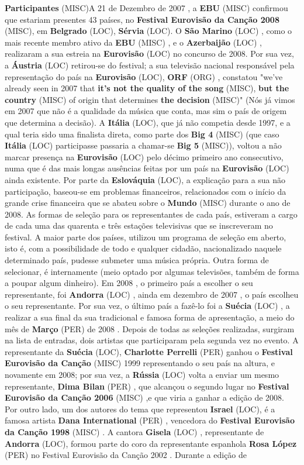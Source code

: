 \documentclass[12pt,a4paper]{article}
\begin{document}
\textbf{Participantes} (MISC)A 21 de Dezembro de 2007 , a \textbf{EBU} (MISC) confirmou que estariam presentes 43 países, no \textbf{Festival Eurovisão da Canção 2008} (MISC), em \textbf{Belgrado} (LOC), \textbf{Sérvia} (LOC). O \textbf{São Marino} (LOC) , como o mais recente membro ativo da \textbf{EBU} (MISC) , e o \textbf{Azerbaijão} (LOC) , realizaram a sua estreia na \textbf{Eurovisão} (LOC) no concurso de 2008. Por sua vez, a \textbf{Áustria} (LOC) retirou-se do festival; a sua televisão nacional responsável pela representação do país na \textbf{Eurovisão} (LOC), \textbf{ORF} (ORG) , constatou "we've already seen in 2007 that \textbf{it's not the quality of the song} (MISC), \textbf{but the country} (MISC) of origin that determines \textbf{the decision} (MISC)" (Nós já vimos em 2007 que não é a qualidade da música que conta, mas sim o país de origem que determina a decisão). A \textbf{Itália} (LOC), que já não competia desde 1997, e a qual teria sido uma finalista direta, como parte dos \textbf{Big 4} (MISC) (que caso \textbf{Itália} (LOC) participasse passaria a chamar-se \textbf{Big 5} (MISC)), voltou a não marcar presença na \textbf{Eurovisão} (LOC) pelo décimo primeiro ano consecutivo, numa que é das mais longas ausências feitas por um país na \textbf{Eurovisão} (LOC) ainda existente. Por parte da \textbf{Eslováquia} (LOC), a explicação para a sua não participação, baseou-se em problemas financeiros, relacionados com o início da grande crise financeira que se abateu sobre o \textbf{Mundo} (MISC) durante o ano de 2008. As formas de seleção para os representantes de cada país, estiveram a cargo de cada uma das quarenta e três estações televisivas que se inscreveram no festival. A maior parte dos países, utilizou um programa de seleção em aberto, isto é, com a possibilidade de todo e qualquer cidadão, nacionalizado naquele determinado país, pudesse submeter uma música própria. Outra forma de selecionar, é internamente (meio optado por algumas televisões, também de forma a poupar algum dinheiro). Em 2008 , o primeiro país a escolher o seu representante, foi \textbf{Andorra} (LOC) , ainda em dezembro de 2007 , o país escolheu o seu representante. Por sua vez, o último país a fazê-lo foi a \textbf{Suécia} (LOC) , a realizar a sua final da sua tradicional e famosa forma de apresentação, a meio do mês de \textbf{Março} (PER) de 2008 . Depois de todas as seleções realizadas, surgiram na lista de entradas, dois artistas que participaram pela segunda vez no evento. A representante da \textbf{Suécia} (LOC), \textbf{Charlotte Perrelli} (PER) ganhou o \textbf{Festival Eurovisão da Canção} (MISC) 1999 representando o seu país na altura, e novamente em 2008; por sua vez, a \textbf{Rússia} (LOC) volta a enviar um mesmo representante, \textbf{Dima Bilan} (PER) , que alcançou o segundo lugar no \textbf{Festival Eurovisão da Canção 2006} (MISC) ,e que viria a ganhar a edição de 2008. Por outro lado, um dos autores do tema que representou \textbf{Israel} (LOC), é a famosa artista \textbf{Dana International} (PER) , vencedora do \textbf{Festival Eurovisão da Canção 1998} (MISC) . A cantora \textbf{Gisela} (LOC) , representante de \textbf{Andorra} (LOC), formou parte do coro da representante espanhola \textbf{Rosa López} (PER) no Festival Eurovisão da Canção 2002 . Durante a edição de 
\end{document}
